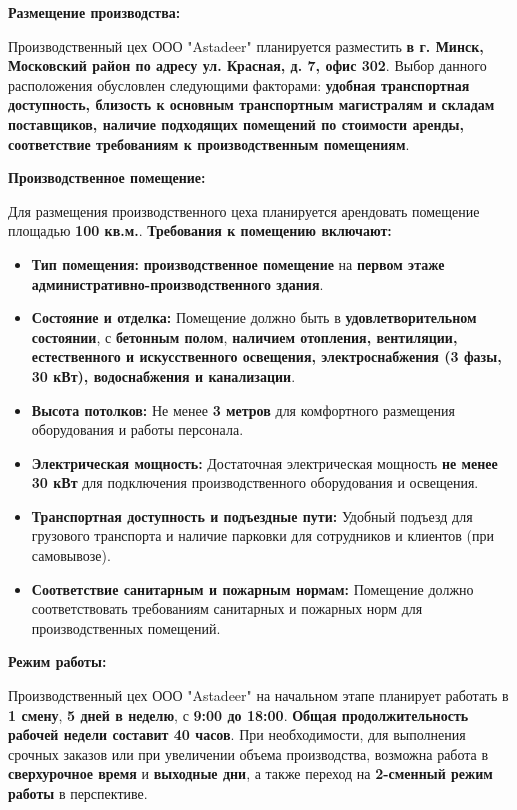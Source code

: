 \vspace{0.3cm}

\textbf{Размещение производства:}

Производственный цех ООО "Astadeer" планируется разместить \textbf{в г. Минск, Московский район по адресу ул. Красная, д. 7, офис 302}.  Выбор данного расположения обусловлен следующими факторами: \textbf{удобная транспортная доступность, близость к основным транспортным магистралям и складам поставщиков, наличие подходящих помещений по стоимости аренды, соответствие требованиям к производственным помещениям}.

\vspace{0.3cm}

\textbf{Производственное помещение:}

Для размещения производственного цеха планируется арендовать помещение площадью \textbf{100 кв.м.}.  \textbf{Требования к помещению включают:}

\begin{itemize}
    \item \textbf{Тип помещения:}  \textbf{производственное помещение} на \textbf{первом этаже}  \textbf{административно-производственного здания}.
    \item \textbf{Состояние и отделка:}  Помещение должно быть в \textbf{удовлетворительном состоянии}, с \textbf{бетонным полом},  \textbf{наличием отопления, вентиляции, естественного и искусственного освещения, электроснабжения (3 фазы, 30 кВт), водоснабжения и канализации}.
    \item \textbf{Высота потолков:}  Не менее \textbf{3 метров} для комфортного размещения оборудования и работы персонала.
    \item \textbf{Электрическая мощность:}  Достаточная электрическая мощность \textbf{не менее 30 кВт} для подключения производственного оборудования и освещения.
    \item \textbf{Транспортная доступность и подъездные пути:}  Удобный подъезд для грузового транспорта и наличие парковки для сотрудников и клиентов (при самовывозе).
    \item \textbf{Соответствие санитарным и пожарным нормам:}  Помещение должно соответствовать требованиям санитарных и пожарных норм для производственных помещений.
\end{itemize}

\vspace{0.3cm}

\textbf{Режим работы:}

Производственный цех ООО "Astadeer" на начальном этапе планирует работать в \textbf{1 смену}, \textbf{5 дней в неделю}, с \textbf{9:00 до 18:00}.  \textbf{Общая продолжительность рабочей недели составит 40 часов}.  При необходимости, для выполнения срочных заказов или при увеличении объема производства, возможна работа в \textbf{сверхурочное время} и \textbf{выходные дни}, а также переход на \textbf{2-сменный режим работы} в перспективе.

